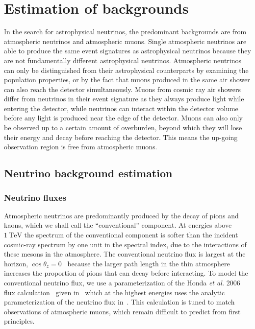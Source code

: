 \chapter{Estimation of backgrounds}\label{chapter:backgrounds}\label{sec:background_estimation}

In the search for astrophysical neutrinos, the predominant backgrounds are from atmospheric neutrinos and atmospheric muons.
Single atmospheric neutrinos are able to produce the same event signatures as astrophysical neutrinos because they are not fundamentally different astrophysical neutrinos.
Atmospheric neutrinos can only be distinguished from their astrophysical counterparts by examining the population properties, or by the fact that muons produced in the same air shower can also reach the detector simultaneously.
Muons from cosmic ray air showers differ from neutrinos in their event signature as they always produce light while entering the detector, while neutrinos can interact within the detector volume before any light is produced near the edge of the detector.
Muons can also only be observed up to a certain amount of overburden, beyond which they will lose their energy and decay before reaching the detector.
This means the up-going observation region is free from atmospheric muons.

\section{Neutrino background estimation}
\subsection{Neutrino fluxes}

Atmospheric neutrinos are predominantly produced by the decay of pions and kaons, which we shall call the ``conventional'' component.
At energies above $\SI{1}\TeV$ the spectrum of the conventional component is softer than the incident cosmic-ray spectrum by one unit in the spectral index, due to the interactions of these mesons in the atmosphere.
The conventional neutrino flux is largest at the horizon, $\cos\theta_z=0$~\cite{Gaisser:2002jj,Barr:2004br,Honda:2006qj,Petrova:2012qf} because the larger path length in the thin atmosphere increases the proportion of pions that can decay before interacting.
To model the conventional neutrino flux, we use a parameterization of the Honda {\it{}et al.} 2006 flux calculation~\cite{Honda:2006qj} given in~\cite{Montaruli:2011as} which at the highest energies uses the analytic parameterization of the neutrino flux in~\cite{Gaisser:2002jj}.
This calculation is tuned to match observations of atmospheric muons, which remain difficult to predict from first principles.

